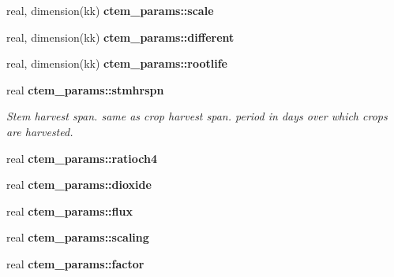\begin{DoxyCompactItemize}
\item 
\hypertarget{namespacectem__params_ac154d66cd49842758f90061b5af47e7f}{}real, dimension(kk) {\bfseries ctem\+\_\+params\+::scale}\label{namespacectem__params_ac154d66cd49842758f90061b5af47e7f}

\item 
\hypertarget{namespacectem__params_a885d8c32720b1ce2023dfa54d477f104}{}real, dimension(kk) {\bfseries ctem\+\_\+params\+::different}\label{namespacectem__params_a885d8c32720b1ce2023dfa54d477f104}

\item 
\hypertarget{namespacectem__params_ad7b9c1585fd85afce280c21bf6f090c9}{}real, dimension(kk) {\bfseries ctem\+\_\+params\+::rootlife}\label{namespacectem__params_ad7b9c1585fd85afce280c21bf6f090c9}

\item 
\hypertarget{namespacectem__params_ae5c80ee006ea823900274412778709cf}{}real {\bfseries ctem\+\_\+params\+::stmhrspn}\label{namespacectem__params_ae5c80ee006ea823900274412778709cf}

\begin{DoxyCompactList}\small\item\em Stem harvest span. same as crop harvest span. period in days over which crops are harvested. \end{DoxyCompactList}\item 
\hypertarget{namespacectem__params_a34074497065d6cb2b9177c3fc400dcf3}{}real {\bfseries ctem\+\_\+params\+::ratioch4}\label{namespacectem__params_a34074497065d6cb2b9177c3fc400dcf3}

\item 
\hypertarget{namespacectem__params_ae4e930ac3c403d79f040be3cf69ee68b}{}real {\bfseries ctem\+\_\+params\+::dioxide}\label{namespacectem__params_ae4e930ac3c403d79f040be3cf69ee68b}

\item 
\hypertarget{namespacectem__params_aa9ccd6ede8d755d2d8cdcf70e78e1d23}{}real {\bfseries ctem\+\_\+params\+::flux}\label{namespacectem__params_aa9ccd6ede8d755d2d8cdcf70e78e1d23}

\item 
\hypertarget{namespacectem__params_a03c590a0e8ea7f5e8fdb2c16d40c6b81}{}real {\bfseries ctem\+\_\+params\+::scaling}\label{namespacectem__params_a03c590a0e8ea7f5e8fdb2c16d40c6b81}

\item 
\hypertarget{namespacectem__params_a049dae570820ee65d54ae37507f7d906}{}real {\bfseries ctem\+\_\+params\+::factor}\label{namespacectem__params_a049dae570820ee65d54ae37507f7d906}


\end{DoxyCompactItemize}
